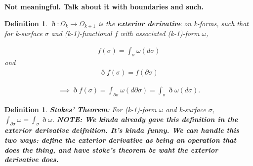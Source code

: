 \documentclass{book}
\newtheorem{defn}[equation]{Definition}
\begin{document}
\textbf{Not meaningful. Talk about it with boundaries and such.}
\begin{defn}
	$\eth : \Omega_k \to \Omega_{k+1}$ is the \textbf{exterior derivative} on k-forms, such that for k-surface $\sigma$ and (k-1)-functional $f$ with associated (k-1)-form $\omega$, 
	
	\begin{gather}f(\sigma) = \int_{\sigma}\omega(d\sigma)\end{gather} and \begin{gather} \eth f(\sigma) = f(\partial\sigma) \end{gather}
	
	\begin{gather}\implies \eth f(\sigma) = \int_{\partial\sigma} \omega(d\partial\sigma) = \int_{\sigma} \eth\omega(d\sigma).\end{gather} 
\end{defn}




 
 
 
 
 
 






\begin{defn}
	\textbf{Stokes' Theorem}: For (k-1)-form $\omega$ and k-surface $\sigma$, $\int_{\partial \sigma}\omega = \int_{\sigma}\eth\omega$. \textbf{NOTE: We kinda already gave this definition in the exterior derivative deifnition. It's kinda funny. We can handle this two ways: define the exterior derivative as being an operation that does the thing, and have stoke's theorem be waht the exterior derivative does. }
\end{defn}
\end{document}
